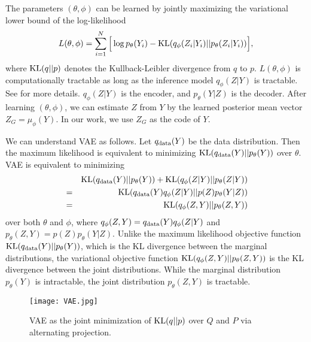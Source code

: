 \documentclass{article}
\def\KL{{\rm KL}}
\begin{document}
The parameters $(\theta, \phi)$ can be learned by jointly maximizing the variational lower bound of the log-likelihood
\begin{eqnarray}
\label{eqn4}
 L(\theta, \phi) = \sum_{i=1}^{N}\Big[ \log p_\theta(Y_i) - {\rm KL}(q_\phi(Z_i|Y_i)|| p_\theta(Z_i|Y_i)) \Big],
\end{eqnarray}
where ${\rm KL}(q||p)$ denotes the Kullback-Leibler divergence from $q$ to $p$. $L(\theta, \phi)$ is computationally tractable as long as the inference model $q_\phi(Z|Y)$ is tractable. See \cite{kingma2013auto} for more details. $q_\phi(Z|Y)$ is the encoder, and $p_\theta(Y|Z)$ is the decoder. After learning $(\theta, \phi)$, we can estimate $Z$ from $Y$ by the learned posterior mean vector $Z_G  =  \mu_\phi(Y)$. In our work, we use $Z_G$ as the code of $Y$.



We can understand VAE as follows. Let $q_{\rm data}(Y)$ be the data distribution. Then the maximum likelihood is equivalent to minimizing ${\rm KL}(q_{\rm data}(Y)||p_\theta(Y))$ over $\theta$. VAE is equivalent to minimizing
\begin{eqnarray}
\label{eqn5}
&&{\rm KL}(q_{\rm data}(Y)||p_\theta(Y)) + {\rm KL}(q_\phi(Z|Y)||p_\theta(Z|Y)) \nonumber \\
&=& {\rm KL}(q_{\rm data}(Y) q_\phi(Z|Y)||p(Z) p_\theta(Y|Z)) \\
&=&  {\rm KL}(q_\phi(Z, Y)||p_\theta(Z, Y))
\end{eqnarray}
over both $\theta$ and $\phi$, where $q_\phi(Z, Y) = q_{\rm data}(Y) q_\phi(Z|Y)$ and $p_\theta(Z, Y) =  p(Z) p_\theta(Y|Z)$.  Unlike the maximum likelihood objective function ${\rm KL}(q_{\rm data}(Y)||p_\theta(Y))$, which is the KL divergence between the marginal distributions, the variational objective function   ${\rm KL}(q_\phi(Z, Y)||p_\theta(Z, Y))$  is the KL divergence between the joint distributions. While the marginal distribution $p_\theta(Y)$ is intractable, the joint distribution $p_\theta(Z, Y)$ is tractable.
\begin{figure}[h]
\begin{center}
\texttt{[image: VAE.jpg]}
\caption{VAE as the joint minimization of $\KL(q||p)$ over $Q$ and $P$ via alternating projection. }
\label{fig:VAE}
\end{center}
\end{figure}
\end{document}
